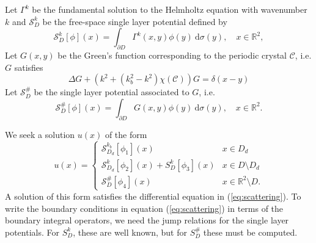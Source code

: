 \documentclass[a4paper]{article}
\theoremstyle{definition}
\newcommand{\R}{\mathbb{R}}
\newcommand{\C}{\mathcal{C}}
\renewcommand{\S}{\mathcal{S}}
\newcommand{\dx}{\: \mathrm{d}}
\newcommand{\Scrystal}{\mathcal{S}_D^\#}
\newcommand{\eqnref}[1]{(\ref {#1})}
\begin{document}
Let $\Gamma^k$ be the fundamental solution to the Helmholtz equation with wavenumber $k$ and $\S_{D}^k$ be the free-space single layer potential defined by
\begin{equation*}
\S_D^k[\phi](x) = \int_{\partial D} \Gamma^k(x,y)\phi(y) \dx \sigma(y), \quad x \in \R^2,
\end{equation*}
Let $G(x,y)$ be the Green's function corresponding to the periodic crystal $\C$, i.e. $G$ satisfies
\begin{equation*} \label{eq:G}
\Delta G + (k^2+(k_b^2-k^2)\chi(\C))G = \delta(x-y)
\end{equation*}
Let $\Scrystal$ be the single layer potential associated to $G$, i.e.
\begin{equation*}
\Scrystal[\phi](x) = \int_{\partial D} G(x,y)\phi(y) \dx \sigma(y) , \quad x \in \R^2.
\end{equation*}

We seek a solution $u(x)$ of the form
\begin{equation} \label{eq:sol}
u(x) = \begin{cases}
\S_{D_d}^{k_b}[\phi_1](x) \quad &x\in D_d \\
\S_{D_d}^{k}[\phi_2](x) + S_D^k[\phi_3](x) & x\in D\setminus D_d \\
\Scrystal[\phi_4](x) & x \in \R^2\setminus D.
\end{cases}
\end{equation}
A solution of this form satisfies the differential equation in \eqnref{eq:scattering}. To write the boundary conditions in equation \eqnref{eq:scattering} in terms of the boundary integral operators, we need the jump relations for the single layer potentials. For $S_D^k$, these are well known, but for $S_D^\#$ these must be computed.
\end{document}
